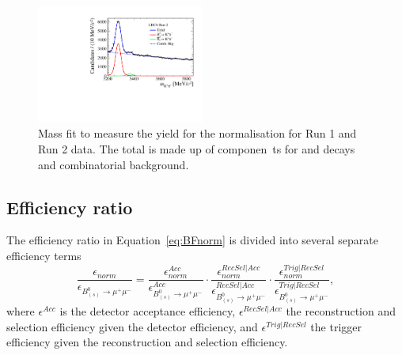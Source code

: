 {{\begin{figure}[tbp]
       \includegraphics[width=0.49\textwidth]{./Figs/BFAnalysis/Bd2KPi_mass_RunII_BDTbinNone.pdf}
    \caption{Mass fit to measure the \bdkpi yield for the normalisation for Run 1 and Run 2 data. The total \pdf is made up of componen\
ts for \bdkpi and \bskpi decays and combinatorial background.}
    \label{fig:Bdkpiyield}
\end{figure}

\subsection{Efficiency ratio}
\label{sec:effratio}
The efficiency ratio in Equation~\ref{eq:BFnorm} is divided into several separate efficiency terms 
\begin{equation}
\frac{\epsilon_{norm}}{\epsilon_{B^{0}_{(s)} \to \mu^{+} \mu^{-}}}  =  \frac{\epsilon^{Acc}_{norm}}{\epsilon^{Acc}_{B^{0}_{(s)} \to \mu^{+} \mu^{-}}} \cdot \frac{\epsilon^{RecSel|Acc}_{norm}}{\epsilon^{RecSel|Acc}_{B^{0}_{(s)} \to \mu^{+} \mu^{-}}} \cdot \frac{\epsilon^{Trig|RecSel}_{norm}}{\epsilon^{Trig|RecSel}_{B^{0}_{(s)} \to \mu^{+} \mu^{-}}},
\label{eq:BFnormDetailed}
\end{equation}
where $\epsilon^{Acc}$ is the detector acceptance efficiency, $\epsilon^{RecSel|Acc}$ the reconstruction and selection efficiency given the detector efficiency, and $\epsilon^{Trig|RecSel}$ the trigger efficiency given the reconstruction and selection efficiency. 

}}
